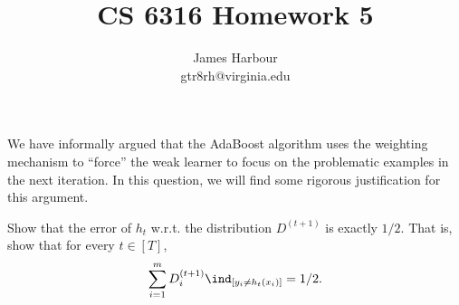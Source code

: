 \documentclass[12pt]{article}
\title{CS 6316 Homework 5}
\author{James Harbour\\gtr8rh@virginia.edu}
\begin{document}
\maketitle

\begin{homeworkProblem}
  We have informally argued that the AdaBoost algorithm uses the weighting mechanism to ``force'' the weak learner to focus on the problematic examples in the next iteration. In this question, we will find some rigorous justification for this argument.

  Show that the error of $ h_{t} $ w.r.t. the distribution $ D^{(t+1)} $ is exactly $ 1/2 $. That is, show that for every $ t\in[T] $,
  \[
    \sum_{i=1}^{m}D_{i}^{(t+1)} \ind_{[y_{i}\neq h_{t}(x_{i})]} = 1/2.
  \]
\end{homeworkProblem}
\end{document}
